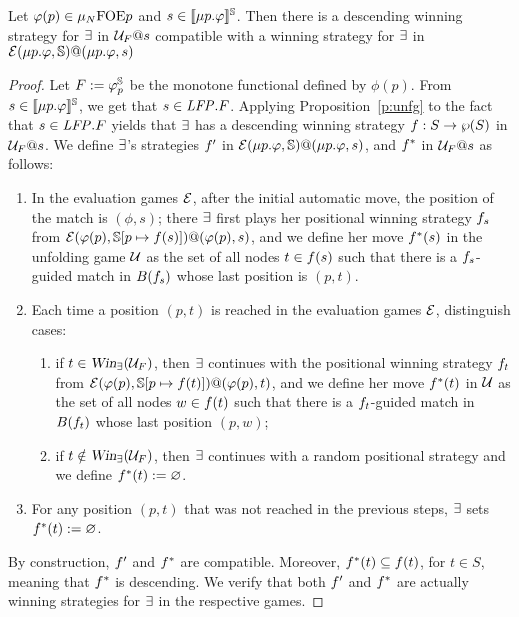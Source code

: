 \begin{proposition}\label{p:unfold=evalgame2}
Let $\varphi(p) \in \mu_{N}\mathrm{FOE}{p}$ and $s \in \llbracket\mu p.\varphi\rrbracket^{\mathbb{S}}$. 
Then there is a descending winning strategy for $\exists$ in $\mathcal{U}_F@s$ 
compatible with a  winning strategy for $\exists$ in 
$\mathcal{E}(\mu p.\varphi,\mathbb{S})@(\mu p.\varphi,s)$
\end{proposition}

\begin{proof}
Let $F \mathrel{:=}  \varphi_{p}^{\mathbb{S}}$ be the monotone functional defined by $\phi(p)$.
From $s \in \llbracket\mu p.\varphi\rrbracket^{\mathbb{S}}$, we get that $s \in \mathit{LFP}. F$.  
Applying Proposition~\ref{p:unfg} to the fact that $s \in \mathit{LFP}. F$ yields that 
$\exists$ has a descending winning strategy $f: S \to \wp{(S)}$ in $\mathcal{U}_{F}@s$. 
We define $\exists$'s strategies $f'$  in
$\mathcal{E}(\mu p.\varphi,\mathbb{S})@(\mu p.\varphi,s)$, and $f^*$ in $\mathcal{U}_{F}@s$ as follows:
\begin{enumerate}
\item 
In the evaluation games $\mathcal{E}$, after the initial automatic move, the position 
of the match is $(\phi,s)$; there $\exists$ first plays her positional winning 
strategy $f_s$ from $\mathcal{E}(\varphi(p),\mathbb{S}[p \mapsto f(s)])@(\varphi(p),
s)$, and we define her move $f^*(s)$ in the unfolding game $\mathcal{U}$ as the 
set of all nodes $t \in f(s)$ such that there is a $f_s$-guided 
match in $B(f_s)$ whose last position is $(p,t)$.
\item 
Each time a position $(p,t)$ is reached in the evaluation games $\mathcal{E}$, 
distinguish cases:
\begin{enumerate}
\item 
if $t \in \text{\sl Win}_{\exists}(\mathcal{U}_{F})$, then $\exists$ continues with the positional
winning strategy $f_t$ from $\mathcal{E}(\varphi(p),\mathbb{S}[p \mapsto
f(t)])@(\varphi(p),t)$, and we define her move $f^*(t)$ in $\mathcal{U}$ as the 
set of all nodes $w \in f(t)$ such that there is a $f_t$-guided
match in $B(f_t)$ whose last position $(p,w)$;
\item 
if $t \notin \text{\sl Win}_{\exists}(\mathcal{U}_{F})$, then $\exists$ continues with a random 
positional strategy and we define $f^*(t)\mathrel{:=} \varnothing$.
\end{enumerate}
\item 
For any position $(p,t)$ that was not reached in the previous steps, $\exists$ 
sets $f^*(t)\mathrel{:=} \varnothing$.
\end{enumerate}
By construction, $f'$ and  $f^*$ are compatible. 
Moreover, $f^*(t) \subseteq f(t)$, for $t \in S$, meaning that 
$f^*$ is descending.
We verify that both $f'$ and  $f^*$ are actually winning strategies
for $\exists$ in the respective games.


\end{proof}
